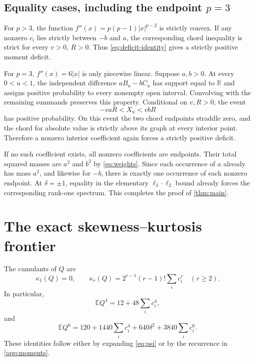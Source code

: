 \documentclass[11pt]{article}
\numberwithin{equation}{section}
\theoremstyle{definition}
\theoremstyle{remark}
\newcommand{\E}{\mathbb E}
\newcommand{\R}{\mathbb R}
\begin{document}
\subsection{Equality cases, including the endpoint $p=3$}
For $p>3$, the function
$f''(x)=p(p-1)|x|^{p-2}$ is strictly convex. If any nonzero $c_i$ lies strictly between $-b$ and $a$, the corresponding chord inequality is strict for every $v>0$, $R>0$. Thus \eqref{eq:deficit-identity} gives a strictly positive moment deficit.

For $p=3$, $f''(x)=6|x|$ is only piecewise linear. Suppose $a,b>0$. At every $0<u<1$, the independent difference $aB_u-bC_u$ has support equal to $\R$ and assigns positive probability to every nonempty open interval. Convolving with the remaining summands preserves this property. Conditional on $v,R>0$, the event
\[
-vaR<X_u<vbR
\]
has positive probability. On this event the two chord endpoints straddle zero, and the chord for absolute value is strictly above its graph at every interior point. Therefore a nonzero interior coefficient again forces a strictly positive deficit.

If no such coefficient exists, all nonzero coefficients are endpoints. Their total squared masses are $a^2$ and $b^2$ by \eqref{eq:weights}. Since each occurrence of $a$ already has mass $a^2$, and likewise for $-b$, there is exactly one occurrence of each nonzero endpoint. At $\delta=\pm1$, equality in the elementary $\ell_3$--$\ell_2$ bound already forces the corresponding rank-one spectrum. This completes the proof of \cref{thm:main}.

\section{The exact skewness--kurtosis frontier}
\label{sec:kurtosis}

The cumulants of $Q$ are
\begin{equation}\label{eq:cumulants}
\kappa_1(Q)=0,\qquad
\kappa_r(Q)=2^{r-1}(r-1)!\sum_i c_i^r\quad(r\geq2).
\end{equation}
In particular,
\begin{equation}\label{eq:fourth-sixth}
\E Q^4=12+48\sum_i c_i^4,
\end{equation}
and
\begin{equation}\label{eq:sixth}
\E Q^6=120+1440\sum_i c_i^4+640\delta^2+3840\sum_i c_i^6.
\end{equation}
These identities follow either by expanding \eqref{eq:psi} or by the recurrence in \cref{app:moments}.
\end{document}
